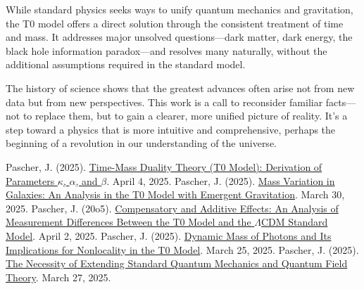 \documentclass[a4paper,12pt]{article}
\begin{document}
	While standard physics seeks ways to unify quantum mechanics and gravitation, the T0 model offers a direct solution through the consistent treatment of time and mass. It addresses major unsolved questions—dark matter, dark energy, the black hole information paradox—and resolves many naturally, without the additional assumptions required in the standard model.
	
	The history of science shows that the greatest advances often arise not from new data but from new perspectives. This work is a call to reconsider familiar facts—not to replace them, but to gain a clearer, more unified picture of reality. It’s a step toward a physics that is more intuitive and comprehensive, perhaps the beginning of a revolution in our understanding of the universe.
	
	\begin{thebibliography}{99}
		 Pascher, J. (2025). \href{https://github.com/jpascher/T0-Time-Mass-Duality/tree/main/2/pdf/English/ZeitMasseT0ParamsEn.pdf}{Time-Mass Duality Theory (T0 Model): Derivation of Parameters \(\kappa\), \(\alpha\), and \(\beta\)}. April 4, 2025.
		 Pascher, J. (2025). \href{https://github.com/jpascher/T0-Time-Mass-Duality/tree/main/2/pdf/English/MassVarGalaxienEn.pdf}{Mass Variation in Galaxies: An Analysis in the T0 Model with Emergent Gravitation}. March 30, 2025.
		 Pascher, J. (20o5). \href{https://github.com/jpascher/T0-Time-Mass-Duality/tree/main/2/pdf/English/MessdifferenzenT0StandardEn.pdf}{Compensatory and Additive Effects: An Analysis of Measurement Differences Between the T0 Model and the \(\Lambda\)CDM Standard Model}. April 2, 2025.
		 Pascher, J. (2025). \href{https://github.com/jpascher/T0-Time-Mass-Duality/tree/main/2/pdf/English/DynMassePhotonenNichtlokalEn.pdf}{Dynamic Mass of Photons and Its Implications for Nonlocality in the T0 Model}. March 25, 2025.
		 Pascher, J. (2025). \href{https://github.com/jpascher/T0-Time-Mass-Duality/tree/main/2/pdf/English/NotwendigkeitQMErweiterungEn.pdf}{The Necessity of Extending Standard Quantum Mechanics and Quantum Field Theory}. March 27, 2025.
	\end{thebibliography}
	
\end{document}
